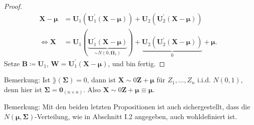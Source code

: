 \documentclass{tstextbook}
\begin{document}
\begin{proof}
	\[
	\begin{aligned}
		\mathbf{X}-\boldsymbol{\mu} & = \mathbf{U}_1\left(\mathbf{U}_1^\prime (\mathbf{X}-\boldsymbol{\mu})\right) + \mathbf{U}_2 \left(\mathbf{U}_2^\prime (\mathbf{X}-\boldsymbol{\mu})\right) \\
		\Leftrightarrow \mathbf{X} & = \mathbf{U}_1(\underbrace{\mathbf{U}_1^\prime (\mathbf{X}-\boldsymbol{\mu})}_{\sim N(0,\mathbf{\Omega}_1)}) + \underbrace{\mathbf{U}_2 \left(\mathbf{U}_2^\prime (\mathbf{X}-\boldsymbol{\mu})\right)}_{0} + \boldsymbol{\mu}.
	\end{aligned}
	\]
	Setze $ \mathbf{B} \coloneqq \mathbf{U}_1 $, $ \mathbf{W} = \mathbf{U}_1^\prime (\mathbf{X}-\boldsymbol{\mu}) $, und bin fertig.
\end{proof}

\begin{remark}
	Bemerkung: Ist $ \rang(\boldsymbol{\Sigma}) = 0 $, dann ist $ \mathbf{X}\sim 0\mathbf{Z}+\boldsymbol{\mu} $ für $ Z_1,\ldots, Z_n $ i.i.d. $ N(0,1) $, denn hier ist $ \boldsymbol{\Sigma} = \boldsymbol{0}_{(n\times n)} $. Also $ \mathbf{X} \sim 0\mathbf{Z} +\boldsymbol{\mu} \equiv \boldsymbol{\mu}. $
\end{remark}	

\begin{remark}
	Bemerkung: Mit den beiden letzten Propositionen ist auch sichergestellt, dass die $ N(\boldsymbol{\mu}, \boldsymbol{\Sigma}) $-Verteilung, wie in Abschnitt I.2 angegeben, auch wohldefiniert ist.
\end{remark}





\printindex
\end{document}
